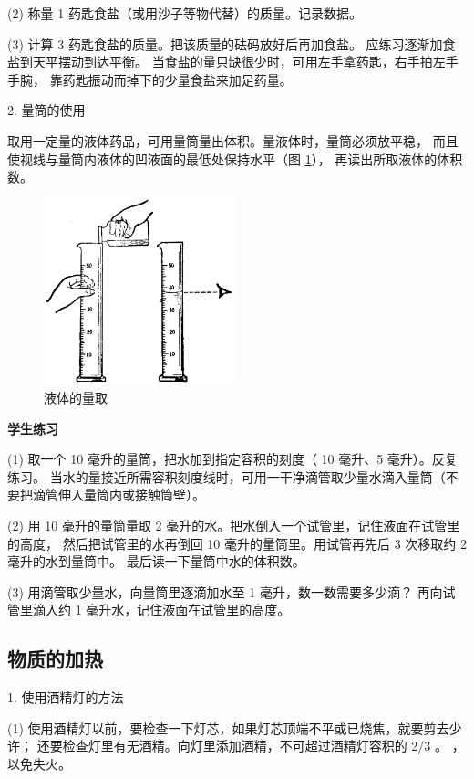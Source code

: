 (2) 称量 1 药匙食盐（或用沙子等物代替）的质量。记录数据。

(3) 计算 3 药匙食盐的质量。把该质量的砝码放好后再加食盐。
应练习逐渐加食盐到天平摆动到达平衡。
当食盐的量只缺很少时，可用左手拿药匙，右手拍左手手腕，
靠药匙振动而掉下的少量食盐来加足药量。

2. 量筒的使用

取用一定量的液体药品，可用量筒量出体积。量液体时，量筒必须放平稳，
而且使视线与量筒内液体的凹液面的最低处保持水平（图 \ref{fig:xssy-5}），
再读出所取液体的体积数。

\begin{figure}[htbp]
    \centering
    \includegraphics[width=0.5\textwidth]{../pic/czhx1-xssy-05}
    \caption{液体的量取}\label{fig:xssy-5}
\end{figure}


\textbf{学生练习}

(1) 取一个 10 毫升的量筒，把水加到指定容积的刻度（ 10 毫升、5 毫升）。反复练习。
当水的量接近所需容积刻度线时，可用一干净滴管取少量水滴入量筒（不要把滴管伸入量筒内或接触筒壁）。

(2) 用 10 毫升的量筒量取 2 毫升的水。把水倒入一个试管里，记住液面在试管里的高度，
然后把试管里的水再倒回 10 毫升的量筒里。用试管再先后 3 次移取约 2 毫升的水到量筒中。
最后读一下量筒中水的体积数。

(3) 用滴管取少量水，向量筒里逐滴加水至 1 毫升，数一数需要多少滴？
再向试管里滴入约 1 毫升水，记住液面在试管里的高度。


\subsection{物质的加热}

1. 使用酒精灯的方法

(1) 使用酒精灯以前，要检查一下灯芯，如果灯芯顶端不平或已烧焦，就要剪去少许；
还要检查灯里有无酒精。向灯里添加酒精，不可超过酒精灯容积的 2/3 。
，以免失火。

